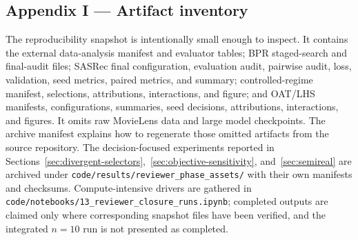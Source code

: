 \documentclass[review]{elsarticle}
\theoremstyle{plain}
\theoremstyle{definition}
\theoremstyle{remark}
\begin{document}
\begin{appendices}
\section*{Appendix I --- Artifact inventory}\label{app:artifacts}
The reproducibility snapshot is intentionally small enough to inspect. It contains the external data-analysis manifest and evaluator tables; BPR staged-search and final-audit files; SASRec final configuration, evaluation audit, pairwise audit, loss, validation, seed metrics, paired metrics, and summary; controlled-regime manifest, selections, attributions, interactions, and figure; and OAT/LHS manifests, configurations, summaries, seed decisions, attributions, interactions, and figures. It omits raw MovieLens data and large model checkpoints. The archive manifest explains how to regenerate those omitted artifacts from the source repository. The decision-focused experiments reported in Sections~\ref{sec:divergent-selectors},~\ref{sec:objective-sensitivity}, and~\ref{sec:semireal} are archived under \texttt{code/results/reviewer\_phase\_assets/} with their own manifests and checksums. Compute-intensive drivers are gathered in \texttt{code/notebooks/13\_reviewer\_closure\_runs.ipynb}; completed outputs are claimed only where corresponding snapshot files have been verified, and the integrated $n=10$ run is not presented as completed.

\end{appendices}



\end{document}
